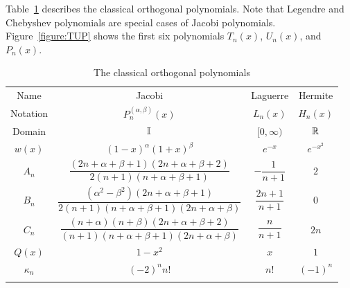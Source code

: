 Table~\ref{table:ClassicalOrthogonalPolynomials} describes the classical orthogonal polynomials. Note that Legendre and Chebyshev polynomials are special cases of Jacobi polynomials. Figure~\ref{figure:TUP} shows the first six polynomials $T_n(x)$, $U_n(x)$, and $P_n(x)$.

\begin{table}[htp]
\caption{The classical orthogonal polynomials}
\begin{center}
\begin{tabular}{cccc}
\sphline
Name & Jacobi & Laguerre & Hermite\\
\sphline
Notation & $P_n^{(\alpha,\beta)}(x)$ & $L_n(x)$ & $H_n(x)$\\
\sphline
Domain & $\mathbb{I}$ & $[0,\infty)$ & $\mathbb{R}$\\
\sphline
$w(x)$ & $(1-x)^\alpha(1+x)^\beta$ & $e^{-x}$ & $e^{-x^2}$\\
$A_n$ & $\dfrac{(2n+\alpha+\beta+1)(2n+\alpha+\beta+2)}{2(n+1)(n+\alpha+\beta+1)}$ & $-\dfrac{1}{n+1}$ & $2$\\
$B_n$ & $\dfrac{(\alpha^2-\beta^2)(2n+\alpha+\beta+1)}{2(n+1)(n+\alpha+\beta+1)(2n+\alpha+\beta)}$ & $\dfrac{2n+1}{n+1}$ & $0$\\
$C_n$ & $\dfrac{(n+\alpha)(n+\beta)(2n+\alpha+\beta+2)}{(n+1)(n+\alpha+\beta+1)(2n+\alpha+\beta)}$ & $\dfrac{n}{n+1}$ & $2n$\\
$Q(x)$ & $1-x^2$ & $x$ & $1$\\
$\kappa_n$ & $(-2)^nn!$ & $n!$ & $(-1)^n$\\
\sphline
\end{tabular}
\end{center}
\label{table:ClassicalOrthogonalPolynomials}
\end{table}%

